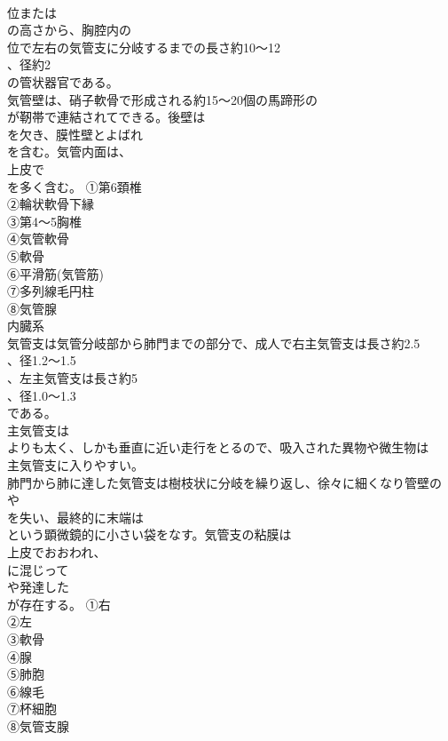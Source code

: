 \documentclass[8pt]{extreport}
\begin{document}
\begin{CJK}{UTF8}{min}
\\	位または
\\	の高さから、胸腔内の
\\	位で左右の気管支に分岐するまでの長さ約10～12
\\	、径約2
\\	の管状器官である。
\\	気管壁は、硝子軟骨で形成される約15～20個の馬蹄形の
\\	が靭帯で連結されてできる。後壁は
\\	を欠き、膜性壁とよばれ
\\	を含む。気管内面は、
\\	上皮で
\\	を多く含む。	①第6頚椎
\\	②輪状軟骨下縁
\\	③第4～5胸椎
\\	④気管軟骨
\\	⑤軟骨
\\	⑥平滑筋(気管筋)
\\	⑦多列線毛円柱
\\	⑧気管腺
\\	内臓系
\\	気管支は気管分岐部から肺門までの部分で、成人で右主気管支は長さ約2.5
\\	、径1.2～1.5
\\	、左主気管支は長さ約5
\\	、径1.0～1.3
\\	である。
\\	主気管支は
\\	よりも太く、しかも垂直に近い走行をとるので、吸入された異物や微生物は
\\	主気管支に入りやすい。
\\	肺門から肺に達した気管支は樹枝状に分岐を繰り返し、徐々に細くなり管壁の
\\	や
\\	を失い、最終的に末端は
\\	という顕微鏡的に小さい袋をなす。気管支の粘膜は
\\	上皮でおおわれ、
\\	に混じって
\\	や発達した
\\	が存在する。	①右
\\	②左
\\	③軟骨
\\	④腺
\\	⑤肺胞
\\	⑥線毛
\\	⑦杯細胞
\\	⑧気管支腺

\end{CJK}
\end{document}
